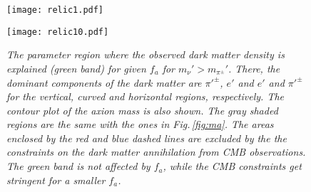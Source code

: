 \documentclass[aps,amsmath,preprint,epsf,superscriptaddress,nofootinbib,notitlepage]{revtex4-1}
\begin{document}
 
\begin{figure}[t]
\begin{center}
 \begin{minipage}{.46\linewidth}
  \texttt{[image: relic1.pdf]}
 \end{minipage}
 \hspace{1cm}
 \begin{minipage}{.46\linewidth}
  \texttt{[image: relic10.pdf]}
 \end{minipage}

 \end{center}
\caption{\sl \small
The parameter region where the observed dark matter density is explained (green band)
for given  $f_a$ for $m_\nu' > m_{\pi^\pm}'$. There, the dominant components of the dark matter are ${\pi'^\pm}$, $e'$ and $e'$ and $\pi'^\pm$ for the vertical, curved and horizontal regions, respectively.
The contour plot of the axion mass is also shown.
The gray shaded regions are the same with the ones in Fig.\,\ref{fig:ma}.
The areas enclosed by the red and blue dashed lines are excluded by the 
the constraints on the dark matter annihilation from CMB observations.
The green band is not affected by $f_a$, while the CMB constraints 
get stringent for a smaller $f_a$.
}
\label{fig:relic1}
\end{figure}
\end{document}
